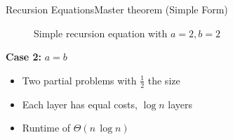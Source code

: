 
\begin{frame}{Recursion Equations}{Master theorem (Simple Form)}
  \begin{figure}[!h]
    \begin{adjustbox}{width=\linewidth}
      \def\AlgoREDivide{2}%
      \def\AlgoRESize{0.5}%
      \def\AlgoREScale{15}%
      
    \end{adjustbox}
    \caption{Simple recursion equation with {\color{Mittel-Blau}$a = 2, b = 2$}}
    \label{fig:recursion_equations:master_theorem_tree_2_2}
  \end{figure}
  \textbf{Case 2:} {\color{Mittel-Blau}$a = b$}
  \begin{itemize}
    \item
      Two partial problems with $\frac{1}{2}$ the size
    \item
      Each layer has equal costs, $\log n$ layers
    \item
      Runtime of {\color{Mittel-Blau}$\Theta(n \, \log n)$}
  \end{itemize}
\end{frame}


%      

